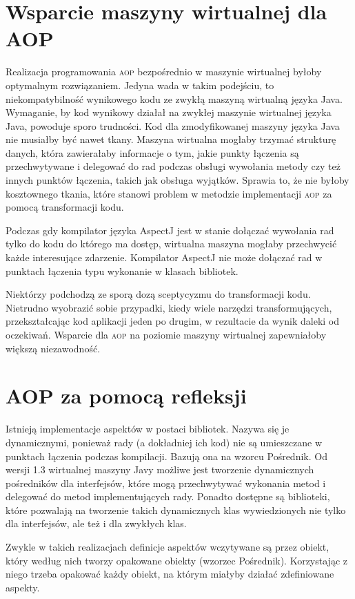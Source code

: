 \documentclass[a4paper,12pt]{mwbk}
\begin{document}
\section{Wsparcie maszyny wirtualnej dla AOP}

Realizacja programowania \textsc{aop} bezpośrednio w maszynie wirtualnej
byłoby optymalnym rozwiązaniem. Jedyna wada w takim podejściu, to
niekompatybilność wynikowego kodu ze zwykłą maszyną wirtualną języka Java.
Wymaganie, by kod wynikowy działał na zwykłej maszynie wirtualnej języka Java,
powoduje sporo trudności. Kod dla zmodyfikowanej maszyny języka Java nie
musiałby być nawet tkany. Maszyna wirtualna mogłaby trzymać strukturę danych,
która zawierałaby informacje o tym, jakie punkty łączenia są przechwytywane i
delegować do rad podczas obsługi wywołania metody czy też innych punktów
łączenia, takich jak obsługa wyjątków. Sprawia to, że nie byłoby kosztownego
tkania, które stanowi problem w metodzie implementacji \textsc{aop} za pomocą
transformacji kodu.

Podczas gdy kompilator języka AspectJ jest w stanie dołączać wywołania rad
tylko do kodu do którego ma dostęp, wirtualna maszyna mogłaby przechwycić
każde interesujące zdarzenie. Kompilator AspectJ nie może dołączać rad w
punktach łączenia typu wykonanie w klasach bibliotek.

Niektórzy podchodzą ze sporą dozą sceptycyzmu do transformacji kodu. Nietrudno
wyobrazić sobie przypadki, kiedy wiele narzędzi transformujących,
przekształcając kod aplikacji jeden po drugim, w rezultacie da wynik daleki
od oczekiwań. Wsparcie dla \textsc{aop} na poziomie maszyny wirtualnej
zapewniałoby większą niezawodność.
 
\section{AOP za pomocą refleksji}
 
Istnieją implementacje aspektów w postaci bibliotek. Nazywa się je
dynamicznymi, ponieważ rady (a dokładniej ich kod) nie są umieszczane w
punktach łączenia podczas kompilacji.  Bazują ona na wzorcu Pośrednik. Od
wersji 1.3 wirtualnej maszyny Javy możliwe jest tworzenie dynamicznych
pośredników dla interfejsów, które mogą przechwytywać wykonania metod i
delegować do metod implementujących rady. Ponadto dostępne są biblioteki,
które pozwalają na tworzenie takich dynamicznych klas wywiedzionych nie
tylko dla interfejsów, ale też i dla zwykłych klas.
 
Zwykle w takich realizacjach definicje aspektów wczytywane są przez obiekt,
który według nich tworzy opakowane obiekty (wzorzec Pośrednik). Korzystając z
niego trzeba opakować każdy obiekt, na którym miałyby działać zdefiniowane
aspekty.
\end{document}
